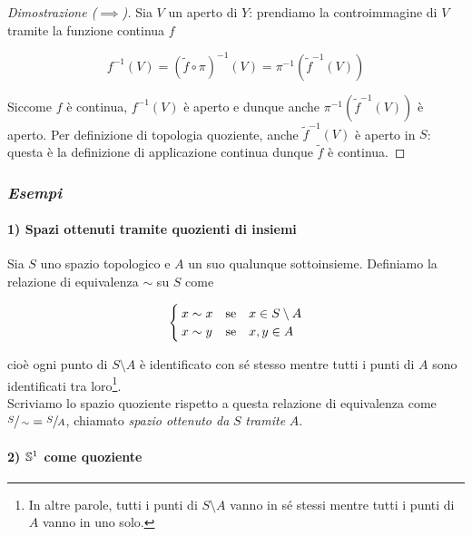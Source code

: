 \begin{proof}[Dimostrazione ($ \implies $)]
	Sia $ V $ un aperto di $ Y $: prendiamo la controimmagine di $ V $ tramite la funzione continua $ f $
	
	\begin{equation}
			f^{-1}(V) = (\tilde{f} \circ \pi)^{-1}(V) = \pi^{-1}(\tilde{f}^{-1}(V))
	\end{equation}

	Siccome $ f $ è continua, $ f^{-1}(V) $ è aperto e dunque anche $ \pi^{-1}(\tilde{f}^{-1}(V)) $ è aperto. Per definizione di topologia quoziente, anche $ \tilde{f}^{-1}(V) $ è aperto in $ S $: questa è la definizione di applicazione continua dunque $ \tilde{f} $ è continua.
\end{proof}

\subsubsection{\textit{Esempi}}

\paragraph{1) Spazi ottenuti tramite quozienti di insiemi}

Sia $ S $ uno spazio topologico e $ A $ un suo qualunque sottoinsieme. Definiamo la relazione di equivalenza $ \sim $ su $ S $ come

\begin{equation}
	\begin{cases}
		x \sim x & \qq*{se} x \in S \setminus A \\
		x \sim y & \qq*{se} x,y \in A
	\end{cases}
\end{equation}

cioè ogni punto di $ S \setminus A $ è identificato con sé stesso mentre tutti i punti di $ A $ sono identificati tra loro\footnote{%
	In altre parole, tutti i punti di $ S \setminus A $ vanno in sé stessi mentre tutti i punti di $ A $ vanno in uno solo.%
}. \\
Scriviamo lo spazio quoziente rispetto a questa relazione di equivalenza come $ \sfrac{S}{\sim} = \sfrac{S}{A} $, chiamato \textit{spazio ottenuto da} $ S $ \textit{tramite} $ A $.

\paragraph{2) $ \S^{1} $ come quoziente}


